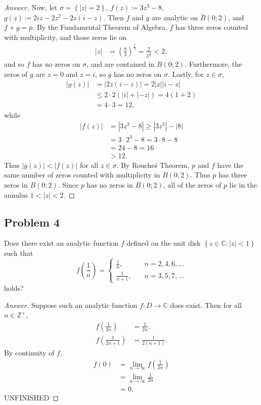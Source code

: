 \documentclass[12pt]{article}
\newcommand{\z}{\mathbb{Z}}
\newcommand{\cx}{\mathbb{C}}
\newcommand\paren[1]{\left( #1 \right)}
\newcommand\setb[1]{\left \{ #1 \right \}}
\newcommand{\abs}[1]{\left| #1 \right|}
\theoremstyle{definition}
\begin{document}
\begin{proof}[Answer]
    Now, let $\sigma = \setb{ |z| = 2 }$, $f(z) \coloneqq 3z^3 - 8$, $g(z) \coloneqq 2iz - 2z^2 - 2z(i-z)$. Then $f$ and $g$ are analytic on $\bar{B}(0;2)$, and $f + g = p$. By the Fundamental Theorem of Algebra, $f$ has three zeros counted with multiplicity, and those zeros lie on 
    \begin{align*}
        |z| & = \paren{ \frac{8}{3} }^{\frac{1}{3}} = \frac{2}{3^{\frac{1}{3}}} < 2,
    \end{align*}
    and so $f$ has no zeros on $\sigma$, and are contained in $B(0;2)$. Furthermore, the zeros of $g$ are $z = 0$ and $z = i$, so $g$ has no zeros on $\sigma$. Lastly, for $z \in \sigma$, 
    \begin{align*}
        \abs{ g(z) } & = \abs{ 2z(i-z) } = 2\abs{z}\abs{i-z} \\
        & \leq 2\cdot2 \paren{ \abs{i} + \abs{-z} } = 4 \paren{1 + 2} \\
        & = 4 \cdot 3 = 12,
    \end{align*}
    while
    \begin{align*}
        \abs{ f(z) } & = \abs{ 3z^3 - 8 } \geq \abs{ 3z^3 } - \abs{ 8 } \\
        & = 3 \cdot 2^3 - 8 = 3 \cdot 8 - 8 \\
        & = 24 - 8 = 16 \\
        & > 12.
    \end{align*}
    Thus $|g(z)| < |f(z)|$ for all $z \in \sigma$. By Rouche\'s Theorem, $p$ and $f$ have the same number of zeros counted with multiplicity in $B(0;2)$. Thus $p$ has three zeros in $B(0;2)$. Since $p$ has no zeros in $B(0;2)$, all of the zeros of $p$ lie in the annulus $1 < |z| < 2$.
\end{proof}
\subsection{Problem 4}
Does there exist an analytic function $f$ defined on the unit disk $\setb{ z \in \cx : |z| < 1 }$ such that 
\[
    f \paren{ \frac{1}{n} } = 
    \begin{cases}
        \frac{1}{n} , & \quad n = 2 , 4 , 6 , \dotsc \\
        \frac{1}{n+1} , & \quad n = 3 , 5 , 7 , \dotsc 
    \end{cases}
\]
holds?
\begin{proof}[Answer]
    Suppose such an analytic function $f : D \to \cx$ does exist. Then for all $n \in \z^+$,
    \begin{align*}
        f \paren{ \frac{1}{2n} } & = \frac{1}{2n}, \\
        f \paren{ \frac{1}{2n+1} } & = \frac{1}{2(n+1)}.
    \end{align*}
    By continuity of $f$,
    \begin{align*}
        f(0) & = \lim\limits_{n \to \infty} f \paren{ \frac{1}{2n} } \\
        & = \lim\limits_{n \to \infty} \frac{1}{2n} \\
        & = 0.
    \end{align*}
    UNFINISHED
\end{proof}
\newpage
\end{document}
